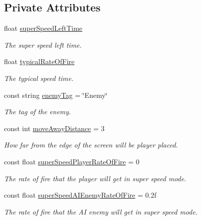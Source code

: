 \subsection*{Private Attributes}
\begin{DoxyCompactItemize}
\item 
float \mbox{\hyperlink{class_player_attributes_a50bc8cd57496e1cea3634400aeda3e6f}{super\+Speed\+Left\+Time}}
\begin{DoxyCompactList}\small\item\em The super speed left time. \end{DoxyCompactList}\item 
float \mbox{\hyperlink{class_player_attributes_a15db75878d8d850cf083ff6a35751fd3}{typical\+Rate\+Of\+Fire}}
\begin{DoxyCompactList}\small\item\em The typical speed time. \end{DoxyCompactList}\item 
const string \mbox{\hyperlink{class_player_attributes_ada16579515985aa8211ab7ab641d7fd1}{enemy\+Tag}} = \char`\"{}Enemy\char`\"{}
\begin{DoxyCompactList}\small\item\em The tag of the enemy. \end{DoxyCompactList}\item 
const int \mbox{\hyperlink{class_player_attributes_a12ebc8e85046ee0c599280cd249c5c85}{move\+Away\+Distance}} = 3
\begin{DoxyCompactList}\small\item\em How far from the edge of the screen will be player placed. \end{DoxyCompactList}\item 
const float \mbox{\hyperlink{class_player_attributes_a76695d1cf2e07103e9efb4cdbdc17672}{super\+Speed\+Player\+Rate\+Of\+Fire}} = 0
\begin{DoxyCompactList}\small\item\em The rate of fire that the player will get in super speed mode. \end{DoxyCompactList}\item 
const float \mbox{\hyperlink{class_player_attributes_a734f84c1f66f934ab934e1314c9cd48f}{super\+Speed\+A\+I\+Enemy\+Rate\+Of\+Fire}} = 0.\+2f
\begin{DoxyCompactList}\small\item\em The rate of fire that the AI enemy will get in super speed mode. \end{DoxyCompactList}\end{DoxyCompactItemize}


